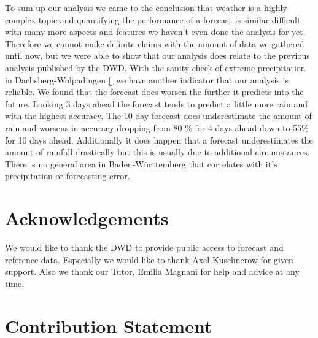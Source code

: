 \documentclass{article}
\theoremstyle{plain}
\theoremstyle{definition}
\theoremstyle{remark}
\begin{document}
To sum up our analysis we came to the conclusion that weather is a highly
complex topic and quantifying the performance of a forecast is similar
difficult with many more aspects and features we haven't even done the analysis
for yet. Therefore we cannot make definite claims with the amount of data we
gathered until now, but we were able to show that our analysis does relate to
the previous analysis published by the DWD. %
With the sanity check of extreme precipitation in Dachsberg-Wolpadingen \ref{}
we have another indicator that our analysis is reliable.
We found that the forecast does worsen the further it predicts into the future.
Looking 3 days ahead the forecast tends to predict a little more rain and with
the highest accuracy. The 10-day forecast does underestimate the amount of rain
and worsens in accuracy dropping from 80 \% for 4 days ahead down to 55\% for
10 days ahead. Additionally it does happen that a forecast underestimates the
amount of rainfall drastically but this is usually due to additional
circumstances. There is no general area in Baden-Württemberg that correlates
with it's precipitation or forecasting error.

\section*{Acknowledgements}

We would like to thank the DWD to provide public access to forecast and
reference data. Especially we would like to thank Axel Kuschnerow for given
support. Also we thank our Tutor, Emilia Magnani for help and advice at any
time.

\section*{Contribution Statement}
\end{document}
